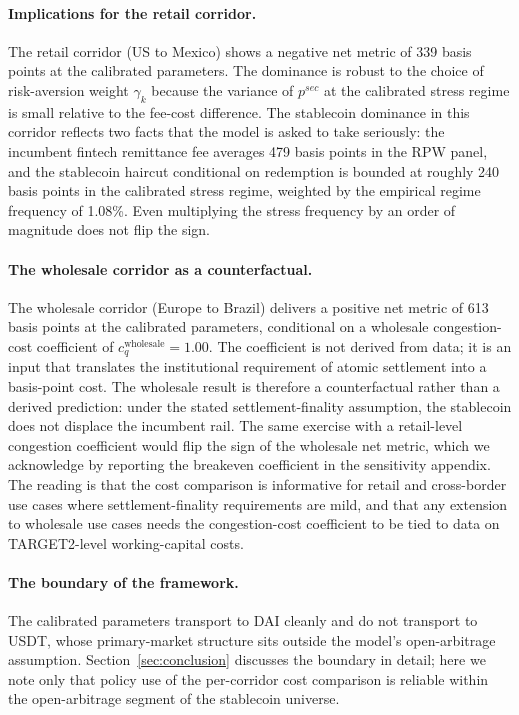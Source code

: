 \paragraph{Implications for the retail corridor.} The retail corridor (US to Mexico) shows a negative net metric of 339 basis points at the calibrated parameters. The dominance is robust to the choice of risk-aversion weight $\gamma_k$ because the variance of $p^{sec}$ at the calibrated stress regime is small relative to the fee-cost difference. The stablecoin dominance in this corridor reflects two facts that the model is asked to take seriously: the incumbent fintech remittance fee averages 479 basis points in the RPW panel, and the stablecoin haircut conditional on redemption is bounded at roughly 240 basis points in the calibrated stress regime, weighted by the empirical regime frequency of 1.08\%. Even multiplying the stress frequency by an order of magnitude does not flip the sign.

\paragraph{The wholesale corridor as a counterfactual.} The wholesale corridor (Europe to Brazil) delivers a positive net metric of 613 basis points at the calibrated parameters, conditional on a wholesale congestion-cost coefficient of $c_q^{\text{wholesale}} = 1.00$. The coefficient is not derived from data; it is an input that translates the institutional requirement of atomic settlement into a basis-point cost. The wholesale result is therefore a counterfactual rather than a derived prediction: under the stated settlement-finality assumption, the stablecoin does not displace the incumbent rail. The same exercise with a retail-level congestion coefficient would flip the sign of the wholesale net metric, which we acknowledge by reporting the breakeven coefficient in the sensitivity appendix. The reading is that the cost comparison is informative for retail and cross-border use cases where settlement-finality requirements are mild, and that any extension to wholesale use cases needs the congestion-cost coefficient to be tied to data on TARGET2-level working-capital costs.

\paragraph{The boundary of the framework.} The calibrated parameters transport to DAI cleanly and do not transport to USDT, whose primary-market structure sits outside the model's open-arbitrage assumption. Section~\ref{sec:conclusion} discusses the boundary in detail; here we note only that policy use of the per-corridor cost comparison is reliable within the open-arbitrage segment of the stablecoin universe.

